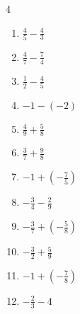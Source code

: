 \begin{multicols}{4}
\begin{enumerate}
\columnbreak %

  \item $\displaystyle \frac{4}{5} - \frac{4}{3}$


  \item $\displaystyle \frac{4}{7} - \frac{7}{4}$


  \item $\displaystyle \frac{1}{2} - \frac{4}{5}$


  \item $\displaystyle -1 - \left(-2\right)$

        \phantom{$\displaystyle =1$}

  \item $\displaystyle \frac{4}{9} + \frac{5}{8}$


  \item $\displaystyle \frac{3}{7} + \frac{9}{8}$


  \item $\displaystyle -1 + \left(-\frac{7}{5}\right)$


  \item $\displaystyle -\frac{3}{4} - \frac{2}{9}$


  \item $\displaystyle -\frac{3}{7} + \left(-\frac{5}{8}\right)$


  \item $\displaystyle -\frac{3}{2} + \frac{5}{9}$


\columnbreak %

  \item $\displaystyle -1 + \left(-\frac{7}{8}\right)$


  \item $\displaystyle -\frac{2}{3} - 4$


\end{enumerate}
\end{multicols}
